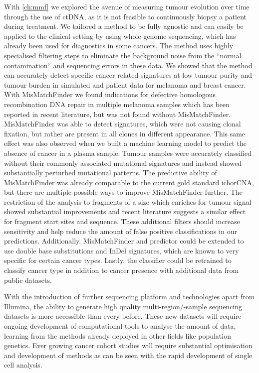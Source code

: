 With \autoref{ch:mmf} we explored the avenue of measuring tumour evolution over time through the use of ctDNA, as it is not feasible to  continuously biopsy a patient during treatment. We tailored a method to be fully agnostic and can easily be applied to the clinical setting by using whole genome sequencing, which has already been used for diagnostics in some cancers. The method uses highly specialised filtering steps to eliminate the background noise from the ``normal contamination`` and sequencing errors in these data. We showed that the method can accurately detect specific cancer related signatures at low tumour purity and tumour burden in simulated and patient data for melanoma and breast cancer. With MisMatchFinder we found indications for defective homologous recombination DNA repair in multiple melanoma samples which has been reported in recent literature, but was not found without MisMatchFinder. MisMatchFinder was able to detect signatures, which were not causing clonal fixation, but rather are present in all clones in different appearance. This same effect was also observed when we built a machine learning model to predict the absence of cancer in a plasma sample. Tumour samples were accurately classified without their commonly associated mutational signatures and instead showed substantially perturbed mutational patterns. The predictive ability of MisMatchFinder was already comparable to the current gold standard ichorCNA, but there are multiple possible ways to improve MisMatchFinder further. The restriction of the analysis to fragments of a size which enriches for tumour signal showed substantial improvements and recent literature suggests a similar effect for fragment start sites and sequence. These additional filters should increase sensitivity and help reduce the amount of false positive classifications in our predictions. Additionally, MisMatchFinder and predictor could be extended to use double base substitutions and InDel signatures, which are known to very specific for certain cancer types. Lastly, the classifier could be retrained to classify cancer type in addition to cancer presence with additional data from public datasets.

With the introduction of further sequencing platform and technologies apart from Illumina, the ability to generate high quality multi-region/-sample sequencing datasets is more accessible than every before. These new datasets will require ongoing development of computational tools to analyse the amount of data, learning from the methods already deployed in other fields like population genetics. Ever growing cancer cohort studies will require substantial optimisation and development of methods as can be seen with the rapid development of single cell analysis. 


